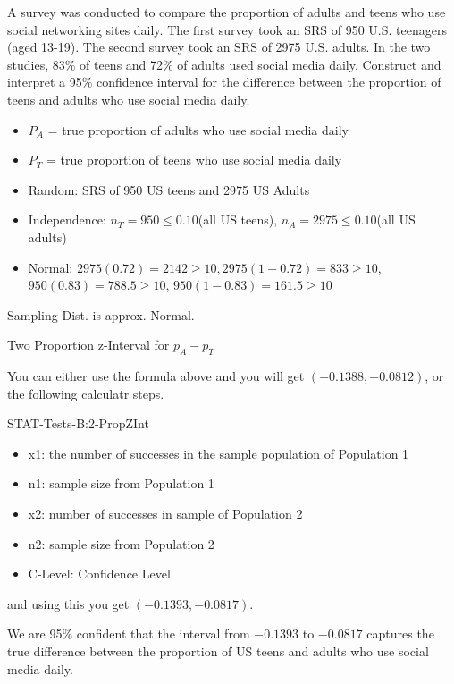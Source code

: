 \documentclass[../stats.tex]{subfiles}
\begin{document}
\begin{example}
    A survey was conducted to compare the proportion of adults and teens who use social networking sites daily. The first survey took an SRS of 950 U.S. teenagers (aged 13-19). The second survey took an SRS of 2975 U.S. adults. In the two studies, 
    83\% of teens and 72\% of adults used social media daily. Construct and interpret a 95\% confidence interval for the difference between the proportion of teens and adults who use social media daily.

    \begin{itemize}
        \item $P_A$ = true proportion of adults who use social media daily 
        \item $P_T$ = true proportion of teens who use social media daily 
    \end{itemize}

    \begin{itemize}
        \item Random: SRS of 950 US teens and 2975 US Adults 
        \item Independence: $n_T=950\leq 0.10$(all US teens), $n_A=2975\leq 0.10$(all US adults)
        \item Normal: $2975(0.72)=2142\geq 10, 2975(1-0.72)=833\geq 10$, $950(0.83)=788.5\geq 10$, $950(1-0.83)=161.5\geq 10$
    \end{itemize}
    Sampling Dist. is approx. Normal.

    Two Proportion z-Interval for $p_A-p_T$

    You can either use the formula above and you will get $(-0.1388, -0.0812)$, or the following calculatr steps.

    STAT-Tests-B:2-PropZInt 
    \begin{itemize}
        \item x1: the number of successes in the sample population of Population 1
        \item n1: sample size from Population 1
        \item x2: number of successes in sample of Population 2 
        \item n2: sample size from Population 2 
        \item C-Level: Confidence Level 
    \end{itemize}

    and using this you get $(-0.1393, -0.0817)$.

    We are 95\% confident that the interval from $-0.1393$ to $-0.0817$ captures the true difference between the proportion of US teens and adults who use social media daily.
\end{example}
\end{document}
